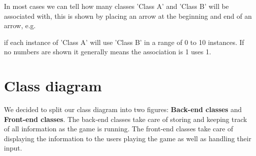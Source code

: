\documentclass{article}
\begin{document}

In most cases we can tell how many classes 'Class A' and 'Class B' will be associated with, this is shown by placing an arrow at the beginning and end of an arrow, e.g.


if each instance of 'Class A' will use 'Class B' in a range of 0 to 10 instances. If no numbers are shown it generally means the association is 1 uses 1.

\section{Class diagram}
We decided to split our class diagram into two figures: \textbf{Back-end classes} and \textbf{Front-end classes}. The back-end classes take care of storing and keeping track of all information as the game is running. The front-end classes take care of displaying the information to the users playing the game as well as handling their input.
\end{document}
